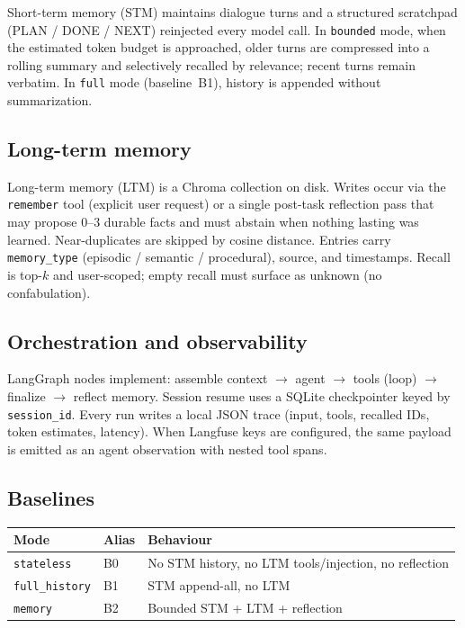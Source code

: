 \documentclass[11pt,a4paper]{article}
\begin{document}
Short-term memory (STM) maintains dialogue turns and a structured scratchpad (PLAN / DONE / NEXT) reinjected every model call. In \texttt{bounded} mode, when the estimated token budget is approached, older turns are compressed into a rolling summary and selectively recalled by relevance; recent turns remain verbatim. In \texttt{full} mode (baseline~B1), history is appended without summarization.

\subsection{Long-term memory}

Long-term memory (LTM) is a Chroma collection on disk. Writes occur via the \texttt{remember} tool (explicit user request) or a single post-task reflection pass that may propose 0--3 durable facts and must abstain when nothing lasting was learned. Near-duplicates are skipped by cosine distance. Entries carry \texttt{memory\_type} (episodic / semantic / procedural), source, and timestamps. Recall is top-\(k\) and user-scoped; empty recall must surface as unknown (no confabulation).

\subsection{Orchestration and observability}

LangGraph nodes implement: assemble context \(\rightarrow\) agent \(\rightarrow\) tools (loop) \(\rightarrow\) finalize \(\rightarrow\) reflect memory. Session resume uses a SQLite checkpointer keyed by \texttt{session\_id}. Every run writes a local JSON trace (input, tools, recalled IDs, token estimates, latency). When Langfuse keys are configured, the same payload is emitted as an agent observation with nested tool spans.

\subsection{Baselines}

\begin{center}
\begin{tabular}{@{}lll@{}}
\toprule
Mode & Alias & Behaviour \\
\midrule
\texttt{stateless} & B0 & No STM history, no LTM tools/injection, no reflection \\
\texttt{full\_history} & B1 & STM append-all, no LTM \\
\texttt{memory} & B2 & Bounded STM + LTM + reflection \\
\bottomrule
\end{tabular}
\end{center}
\end{document}
